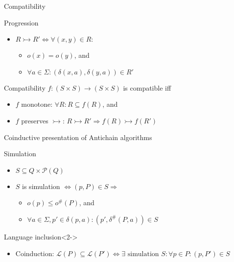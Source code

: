 \documentclass[compress]{beamer}
\begin{document}
\begin{frame}{Compatibility}
  \begin{block}{Progression}
    \begin{itemize}
      \item $R \rightarrowtail R' \iff \forall (x, y) \in R:$\\
        \begin{itemize}
          \item $o(x) = o(y)$, and
          \item $\forall a \in \Sigma: (\delta(x, a), \delta(y, a)) \in R'$
        \end{itemize}
    \end{itemize}
  \end{block}

  \begin{block}{Compatibility}
    $f : (S \times S) \to (S \times S)$ is compatible iff \\
    \begin{itemize}
      \item $f$ monotone: $\forall R: R \subseteq f(R)$, and
      \item $f$ preserves $\rightarrowtail$:
        $R \rightarrowtail R' \Rightarrow f(R) \rightarrowtail f(R')$
    \end{itemize}
  \end{block}
\end{frame}

\begin{frame}{Coinductive presentation of Antichain algorithms}
  \begin{block}{Simulation}
    \begin{itemize}
      \item $S \subseteq Q \times \mathcal{P}(Q)$
      \item $S$ is simulation $\iff (p, P) \in S \Rightarrow $
        \begin{itemize}
          \item $o(p) \leq o^\#(P)$, and
          \item $\forall a \in \Sigma, p' \in \delta(p, a): (p', \delta^\#(P, a)) \in S$
        \end{itemize}
    \end{itemize}
  \end{block}

  \begin{block}{Language inclusion}<2->
    \begin{itemize}
      \item Coinduction: $\mathcal{L}(P) \subseteq \mathcal{L}(P') \iff \exists \text{ simulation } S: \forall p \in P: (p, P') \in S$
    \end{itemize}
  \end{block}
\end{frame}
\end{document}
